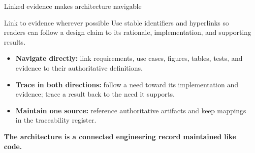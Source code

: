 \begin{frame}{Linked evidence makes architecture navigable}
\begin{slidecallout}{Link to evidence wherever possible}
Use stable identifiers and hyperlinks so readers can follow a design claim to its rationale, implementation, and supporting results.
\end{slidecallout}
\begin{itemize}
  \item \textbf{Navigate directly:} link requirements, use cases, figures, tables, tests, and evidence to their authoritative definitions.
  \item \textbf{Trace in both directions:} follow a need toward its implementation and evidence; trace a result back to the need it supports.
  \item \textbf{Maintain one source:} reference authoritative artifacts and keep mappings in the traceability register.
\end{itemize}
\vspace{0.15cm}
\textbf{The architecture is a connected engineering record maintained like code.}
\end{frame}
